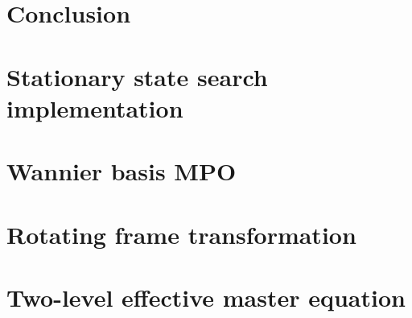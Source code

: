 \documentclass[a4paper,oneside,12pt]{hwthesis}
\newcommand*{\chappath}{../../include/chapters}
\newcommand*{\refpath}{../../include/refs}
\begin{document}


\chapter{\label{chp:Conclusion}Conclusion}



\appendix
\chapter{\label{chp:mpostat}Stationary state search implementation}



\chapter{\label{chp:dimmpo}Wannier basis MPO}



\chapter{\label{chp:rotframe}Rotating frame transformation}



\chapter{\label{chp:adelim}Two-level effective master equation}





\end{document}
